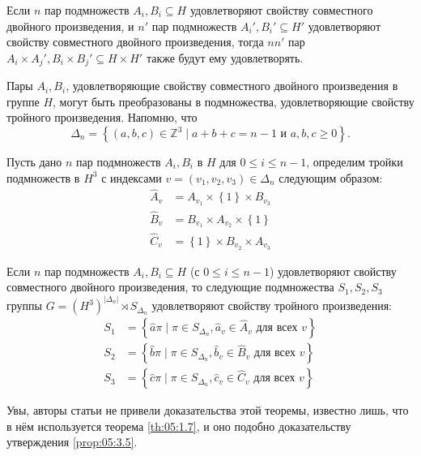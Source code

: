 \begin{lemma}\label{lem:05:4.2}
  Если $n$ пар подмножеств $A_i, B_i \subseteq H$ удовлетворяют свойству совместного двойного произведения, и $n'$ пар подмножеств $A_i', B_i' \subseteq H'$ удовлетворяют свойству совместного двойного произведения, тогда $n n'$ пар $A_i \times A_j', B_i \times B_j' \subseteq H \times H'$ также будут ему удовлетворять.
\end{lemma}

Пары $A_i, B_i$, удовлетворяющие свойству совместного двойного произведения в группе $H$, могут быть преобразованы в подмножества, удовлетворяющие свойству тройного произведения. Напомню, что
\[
	\Delta_n = \left\{ (a,b,c) \in \mathbb{Z}^3 \mid a+b+c=n-1 \text{ и } a,b,c \geq 0\right\}.
\]

Пусть дано $n$ пар подмножеств $A_i, B_i$ в $H$  для $0 \leq i \leq n-1$, определим тройки подмножеств в $H^3$ с индексами $v=(v_1,v_2,v_3) \in \Delta_n$ следующим образом:
\begin{align*}
  \widehat{A}_v & = A_{v_1} \times \left\{ 1 \right\} \times B_{v_3}\\
  \widehat{B}_v & = B_{v_1} \times A_{v_2} \times \left\{ 1 \right\}\\
  \widehat{C}_v & = \left\{ 1 \right\} \times B_{v_2} \times A_{v_3}
\end{align*}

\begin{theorem}\label{th:05:4.3}
  Если $n$ пар подмножеств $A_i, B_i \subseteq H$ (с $0 \leq i \leq n-1$) удовлетворяют свойству совместного двойного произведения, то следующие подмножества $S_1,S_2,S_3$ группы $G=(H^3)^{|\Delta_n|} \rtimes S_{\Delta_n} $ удовлетворяют свойству тройного произведения:
  \begin{align*}
    S_1 & = \left\{ \widehat{a} \pi \mid \pi \in S_{\Delta_n},  \widehat{a}_v \in \widehat{A}_v \text{ для всех } v \right\}\\
    S_2 & = \left\{ \widehat{b} \pi \mid \pi \in S_{\Delta_n},  \widehat{b}_v \in \widehat{B}_v \text{ для всех } v \right\}\\
    S_3 & = \left\{ \widehat{c} \pi \mid \pi \in S_{\Delta_n},  \widehat{c}_v \in \widehat{C}_v \text{ для всех } v \right\}
  \end{align*}
\end{theorem}

Увы, авторы статьи не привели доказательства этой теоремы, известно лишь, что в нём используется теорема \ref{th:05:1.7}, и оно подобно доказательству утверждения \ref{prop:05:3.5}.

